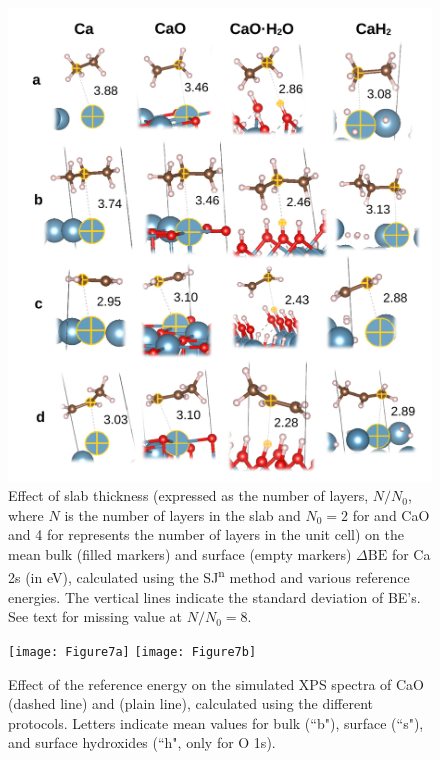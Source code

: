 \documentclass[%
aip,
amsmath,amssymb,
preprint,%
jcp,
showkeys,
]{revtex4-2}
\def\dbe{\ensuremath{\Delta\text{BE}}}
\begin{document}
\begin{figure}[p]
	\centering
	\includegraphics[width=.8\linewidth]{Figure6}
	\caption{Effect of slab thickness (expressed as the number of layers, $N/N_0$, where $N$ is the number of layers in the slab and $N_0 = 2$ for  and CaO and 4 for  represents the number of layers in the unit cell)  on the mean bulk (filled markers) and surface (empty markers) \dbe{} for Ca 2s (in \si{\electronvolt}), calculated using the SJ\textsuperscript{n} method and various reference energies. The vertical lines indicate the standard deviation of BE's. See text for missing value at $N/N_0=8$.}
	\label{fig:slabsthicknessSJn}
\end{figure}


\begin{figure}[p]
	\centering
	\texttt{[image: Figure7a]}
	\texttt{[image: Figure7b]}
	\caption{Effect of the reference energy on the simulated XPS spectra of CaO (dashed line)  and  (plain line), calculated using the different protocols. Letters indicate mean values for bulk (``b"), surface (``s"), and surface hydroxides (``h", only for   O 1s).}
	\label{fig:slabOH2}
\end{figure}
\end{document}
